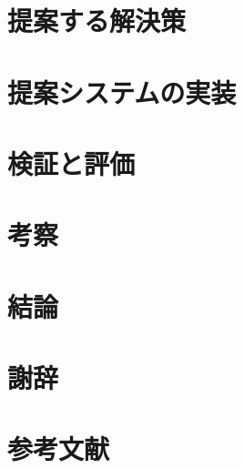 \documentclass[a4paper]{jreport}
\begin{document}
\chapter{提案する解決策}


\chapter{提案システムの実装}


\chapter{検証と評価}


\chapter{考察}


\chapter{結論}


\chapter{謝辞}
\chapter{参考文献}
\end{document}
